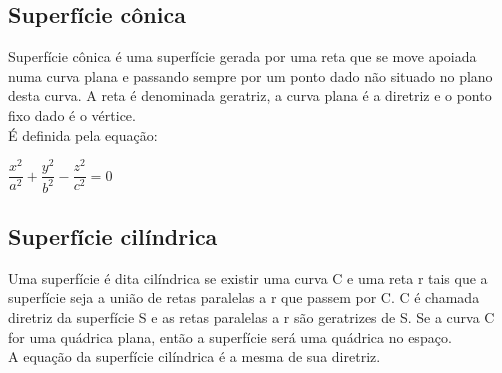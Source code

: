 \documentclass[12 pt, a4 paper]{article}
\begin{document}
\subsection{Superfície cônica}
Superfície cônica é uma superfície gerada por uma reta que se move apoiada numa curva plana e passando sempre por um ponto dado não situado no plano desta curva. A reta é denominada geratriz, a curva plana é a diretriz e o ponto fixo dado é o vértice.
\\É definida pela equação:
\begin{center}
$\dfrac{x^2}{a^2} + \dfrac{y^2}{b^2} - \dfrac{z^2}{c^2} = 0$
\end{center}

\subsection{Superfície cilíndrica}
Uma superfície é dita cilíndrica se existir uma curva C e uma reta r tais que a superfície seja a união de retas paralelas a r que passem por C. C é chamada diretriz da superfície S e as retas paralelas a r são geratrizes de S.
Se a curva C for uma quádrica plana, então a superfície será uma quádrica no espaço.
\\A equação da superfície cilíndrica é a mesma de sua diretriz.
\end{document}
